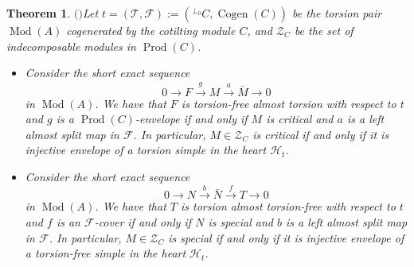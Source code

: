 \documentclass[12pt]{amsart}
\numberwithin{equation}{section}
\newtheorem{theorem}[lemma]{Theorem}
\theoremstyle{definition}
\DeclareMathOperator{\Mod}{Mod}
\DeclareMathOperator{\Cogen}{Cogen}
\DeclareMathOperator{\Prod}{Prod}
\newtheorem*{theorem 0*}{Theorem}
\newtheorem*{theorem a*}{Theorem A}
\newtheorem*{theorem b*}{Theorem B}
\numberwithin{diagram}{section}
\begin{document}
\begin{theorem}$($\cite{AHL}$)$\label{3.9}
Let $t=(\mathcal{T},\mathcal{F}):=({}^{\bot_0}C,\Cogen(C))$ be the torsion pair $\Mod(A)$ cogenerated by the cotilting module $C$, and $\mathcal{Z}_C$ be the set of indecomposable modules in $\Prod(C)$.
\begin{itemize}
	\item[(1)] Consider the short exact sequence
	\begin{equation}\label{eq3.2}
	0\rightarrow F\overset{g}{\longrightarrow} M\overset{a}{\longrightarrow} \bar{M}\rightarrow 0
	\end{equation}
    in $\Mod(A)$. We have that $F$ is torsion-free almost torsion with respect to $t$ and $g$ is a $\Prod(C)$-envelope if and only if $M$ is critical and $a$ is a left almost split map in $\mathcal{F}$. In particular, $M\in\mathcal{Z}_C$ is critical if and only if it is injective envelope of a torsion simple in the heart $\mathcal{H}_t$. 
			\item[(2)] Consider the short exact sequence
	\begin{equation}\label{eq3.3}
	0\rightarrow N\overset{b}{\longrightarrow} \bar{N}\overset{f}{\longrightarrow} T\rightarrow 0
	\end{equation}
	in $\Mod(A)$. We have that $T$ is torsion almost torsion-free with respect to $t$ and $f$ is an $\mathcal{F}$-cover if and only if $N$ is special and $b$ is a left almost split map in $\mathcal{F}$. In particular, $M\in\mathcal{Z}_C$ is special if and only if it is injective envelope of a torsion-free simple in the heart $\mathcal{H}_t$. 
		\end{itemize}
	\end{theorem}
	
\end{document}
